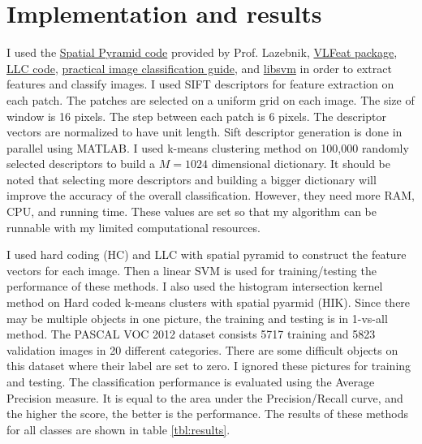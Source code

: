 \documentclass[a4paper,12pt]{article}
\begin{document}
\section{Implementation and results}
I used the \href{http://www.cs.illinois.edu/homes/slazebni/research/SpatialPyramid.zip}{Spatial Pyramid code} provided by Prof. Lazebnik, \href{http://www.vlfeat.org/}{VLFeat package}, \href{http://www.ifp.illinois.edu/~jyang29/LLC.htm}{LLC code}, \href{http://www.robots.ox.ac.uk/~vgg/share/practical-image-classification.htm}{practical image classification guide}, and \href{http://www.csie.ntu.edu.tw/~cjlin/libsvm/}{libsvm} in order to extract features and classify images.
 I used SIFT descriptors for feature extraction on each patch. The patches are selected on a uniform grid on each image. The size of window is 16 pixels. The step between each patch is 6 pixels. The descriptor vectors are normalized to have unit length. Sift descriptor generation is done in parallel using MATLAB.
I used k-means clustering method on 100,000 randomly selected descriptors to build a $M = 1024$ dimensional dictionary. It should be noted that selecting more descriptors and building a bigger dictionary will improve the accuracy of the overall classification. However, they need more RAM, CPU, and running time. These values are set so that my algorithm can be runnable with my limited computational resources. 

I used hard coding (HC) and LLC with spatial pyramid to construct the feature vectors for each image. Then a linear SVM is used for training/testing the performance of these methods. I also used the histogram intersection kernel method on Hard coded k-means clusters with spatial pyarmid (HIK). Since there may be multiple objects in one picture, the training and testing is in 1-vs-all method.
The PASCAL VOC 2012 dataset consists 5717 training and 5823 validation images in 20 different categories. 
There are some difficult objects on this dataset where their label are set to zero. I ignored these pictures for training and testing.
The classification performance is evaluated using the Average Precision measure. It is equal to the area under the Precision/Recall curve, and the higher the score, the better is the performance.  The results of these methods for all classes are shown in table \ref{tbl:results}.
\end{document}
